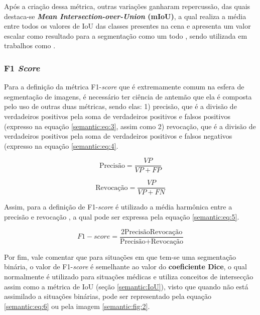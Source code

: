 Após a criação dessa métrica, outras variações ganharam repercussão, das quais destaca-se \textbf{\textit{Mean Intersection-over-Union} (mIoU)}, a qual realiza a média entre todos os valores de IoU das classes presentes na cena e apresenta um valor escalar como resultado para a segmentação como um todo \cite{Minaee2021}, sendo utilizada em trabalhos como \cite{Mohan2020}.


\subsubsection{F1 \textit{Score}}
\label{semantic:f1}

Para a definição da métrica F1-\textit{score} que é extremamente comum na esfera de segmentação de imagens, é necessário ter ciência de antemão que ela é composta pelo uso de outras duas métricas, sendo elas: 1) precisão, que é a divisão de verdadeiros positivos pela soma de verdadeiros positivos e falsos positivos (expresso na equação \ref{semantic:eq:3}, assim como 2) revocação, que é a divisão de verdadeiros positivos pela soma de verdadeiros positivos e falsos negativos (expresso na equação \ref{semantic:eq:4}.

\begin{equation}
    \label{semantic:eq:3}
    \text{Precisão} = \frac{VP}{VP + FP}
\end{equation}

\begin{equation}
    \label{semantic:eq:4}
    \text{Revocação} = \frac{VP}{VP + FN}
\end{equation}

Assim, para a definição de F1-\textit{score} é utilizado a média harmônica entre a precisão e revocação \cite{Minaee2021}, a qual pode ser expressa pela equação \ref{semantic:eq:5}.

\begin{equation}
    \label{semantic:eq:5}
    F1-score = \frac{2 \text{Precisão} \text{Revocação}}{\text{Precisão} + \text{Revocação}}
\end{equation}

Por fim, vale comentar que para situações em que tem-se uma segmentação binária, o valor de F1-\textit{score} é semelhante ao valor do \textbf{coeficiente Dice}, o qual normalmente é utilizado para situações médicas \cite{Minaee2021} e utiliza conceitos de intersecção assim como a métrica de IoU (seção \ref{semantic:IoU}), visto que quando não está assimilado a situações binárias, pode ser representado pela equação \ref{semantic:eq:6} ou pela imagem \ref{semantic:fig:2}.

